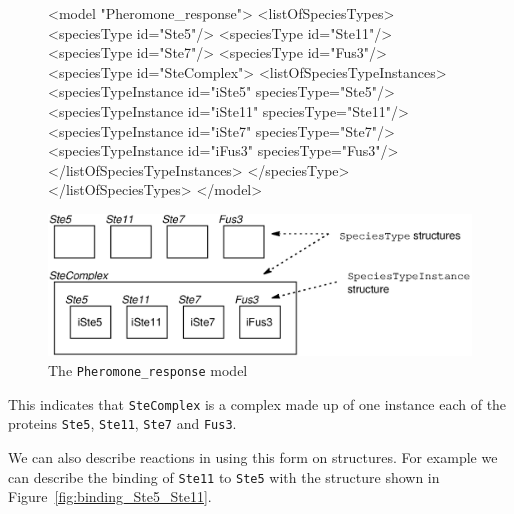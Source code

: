 \documentclass{cekarticle}
\begin{document}
\begin{figure}[h]
\begin{example}
<model "Pheromone_response">
    <listOfSpeciesTypes>
        <speciesType id="Ste5"/>
        <speciesType id="Ste11"/>
        <speciesType id="Ste7"/>
        <speciesType id="Fus3"/>
        <speciesType id="SteComplex">
            <listOfSpeciesTypeInstances>
                <speciesTypeInstance id="iSte5" speciesType="Ste5"/>
                <speciesTypeInstance id="iSte11" speciesType="Ste11"/>
                <speciesTypeInstance id="iSte7" speciesType="Ste7"/>
                <speciesTypeInstance id="iFus3" speciesType="Fus3"/>
            </listOfSpeciesTypeInstances>
        </speciesType>
    </listOfSpeciesTypes>
</model>
\end{example}
  \vspace*{8pt}
  \centering
  \includegraphics[scale = 0.7]{pheromone_response.eps}
  \caption{The \texttt{Pheromone\_response} model}
  \label{fig:pheromone_response}
\end{figure}

This indicates that \texttt{SteComplex}
is a complex made up of one instance each of the proteins \texttt{Ste5}, \texttt{Ste11}, \texttt{Ste7}
and \texttt{Fus3}.

We can also describe reactions in using this form on  structures.  For example
we can describe the binding of \texttt{Ste11} to \texttt{Ste5} with the 
structure shown in Figure~\ref{fig:binding_Ste5_Ste11}.
\end{document}

